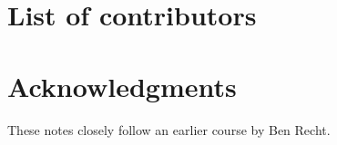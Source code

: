 \section*{List of contributors}

\section*{Acknowledgments}

These notes closely follow an earlier course by Ben Recht.
